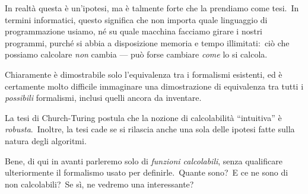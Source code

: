 \noindent In realtà questa è un'ipotesi, ma è talmente forte che la prendiamo come tesi.\
In termini informatici, questo significa che non importa quale linguaggio di programmazione usiamo, né su quale macchina facciamo girare i nostri programmi, purché si abbia a disposizione memoria e tempo illimitati:\ ciò che possiamo calcolare \textit{non} cambia --- può forse cambiare \textit{come} lo si calcola.

Chiaramente è dimostrabile solo l'equivalenza tra i formalismi esistenti, ed è certamente molto difficile immaginare una dimostrazione di equivalenza tra tutti i \textit{possibili} formalismi, inclusi quelli ancora da inventare.

La tesi di Church-Turing postula che la nozione di calcolabilità ``intuitiva'' è \textit{robusta}.\
Inoltre, la tesi cade se si rilascia anche una sola delle ipotesi fatte sulla natura degli algoritmi.

Bene, di qui in avanti parleremo solo di \textit{funzioni calcolabili}, senza qualificare ulteriormente il formalismo usato per definirle.\
Quante sono?\ E ce ne sono di non calcolabili?\ Se sì, ne vedremo una interessante?
